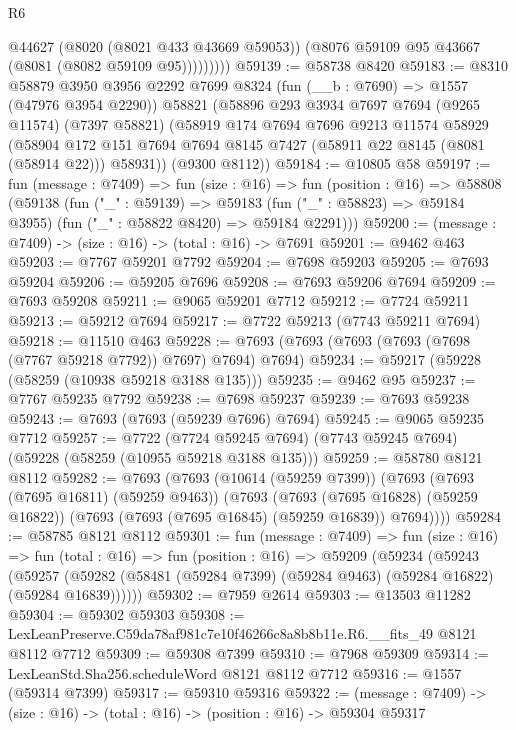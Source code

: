 \begin{lexlean}{R6}
\begin{coremodule}
                @44627
                (@8020 (@8021 @433 @43669 @59053))
                (@8076 @59109 @95 @43667 (@8081 (@8082 @59109 @95)))))))))
@59139 := @58738 @8420
@59183 := @8310
    @58879
    @3950
    @3956
    @2292
    @7699
    @8324
    (fun (__b : @7690) => @1557 (@47976 @3954 @2290))
    @58821
    (@58896
      @293
      @3934
      @7697
      @7694
      (@9265 @11574)
      (@7397 @58821)
      (@58919
        @174
        @7694
        @7696
        @9213
        @11574
        @58929
        (@58904 @172 @151 @7694 @7694 @8145 @7427 (@58911 @22 @8145 (@8081 (@58914 @22))) @58931))
      (@9300 @8112))
@59184 := @10805 @58
@59197 := fun (message : @7409) =>
  fun (size : @16) =>
  fun (position : @16) =>
  @58808
    (@59138
      (fun ("_" : @59139) =>
      @59183 (fun ("_" : @58823) => @59184 @3955) (fun ("_" : @58822 @8420) => @59184 @2291)))
@59200 := (message : @7409) -> (size : @16) -> (total : @16) -> @7691
@59201 := @9462 @463
@59203 := @7767 @59201 @7792
@59204 := @7698 @59203
@59205 := @7693 @59204
@59206 := @59205 @7696
@59208 := @7693 @59206 @7694
@59209 := @7693 @59208
@59211 := @9065 @59201 @7712
@59212 := @7724 @59211
@59213 := @59212 @7694
@59217 := @7722 @59213 (@7743 @59211 @7694)
@59218 := @11510 @463
@59228 := @7693 (@7693 (@7693 (@7693 (@7698 (@7767 @59218 @7792)) @7697) @7694) @7694)
@59234 := @59217 (@59228 (@58259 (@10938 @59218 @3188 @135)))
@59235 := @9462 @95
@59237 := @7767 @59235 @7792
@59238 := @7698 @59237
@59239 := @7693 @59238
@59243 := @7693 (@7693 (@59239 @7696) @7694)
@59245 := @9065 @59235 @7712
@59257 := @7722
    (@7724 @59245 @7694)
    (@7743 @59245 @7694)
    (@59228 (@58259 (@10955 @59218 @3188 @135)))
@59259 := @58780 @8121 @8112
@59282 := @7693
    (@7693
      (@10614 (@59259 @7399))
      (@7693
        (@7693 (@7695 @16811) (@59259 @9463))
        (@7693
          (@7693 (@7695 @16828) (@59259 @16822))
          (@7693 (@7693 (@7695 @16845) (@59259 @16839)) @7694))))
@59284 := @58785 @8121 @8112
@59301 := fun (message : @7409) =>
  fun (size : @16) =>
  fun (total : @16) =>
  fun (position : @16) =>
  @59209
    (@59234
      (@59243
        (@59257 (@59282 (@58481 (@59284 @7399) (@59284 @9463) (@59284 @16822) (@59284 @16839))))))
@59302 := @7959 @2614
@59303 := @13503 @11282
@59304 := @59302 @59303
@59308 := LexLeanPreserve.C59da78af981c7e10f46266c8a8b8b11e.R6.__fits_49 @8121 @8112 @7712
@59309 := @59308 @7399
@59310 := @7968 @59309
@59314 := LexLeanStd.Sha256.scheduleWord @8121 @8112 @7712
@59316 := @1557 (@59314 @7399)
@59317 := @59310 @59316
@59322 := (message : @7409) -> (size : @16) -> (total : @16) -> (position : @16) -> @59304 @59317

\end{coremodule}
\end{lexlean}
